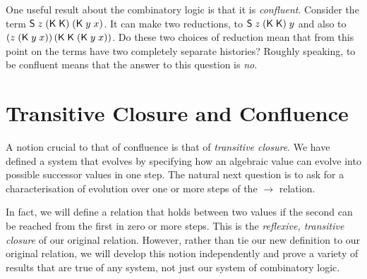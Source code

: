 \documentclass[12pt]{article}
\newcommand{\KC}{\con{K}}
\newcommand{\SC}{\con{S}}
\begin{document}
    One useful result about the combinatory logic is that it is
    \emph{confluent}.  Consider the term $\SC\;z\;(\KC\;\KC)\;(\KC\;
    y\; x)$.  It can make two reductions, to $\SC\;z\;(\KC\;\KC)\;y$
    and also to $(z\;(\KC\;y\;x))\,(\KC\;\KC\;(\KC\;y\;x))$.  Do these
    two choices of reduction mean that from this point on the terms
    have two completely separate histories?  Roughly speaking, to be
    confluent means that the answer to this question is \emph{no}.


\section{Transitive Closure and Confluence}
\label{sec:Transitive-Clos-Conf}

A notion crucial to that of confluence is that of \emph{transitive
  closure}.  We have defined a system that evolves by specifying how
an algebraic value can evolve into possible successor values in one
step.  The natural next question is to ask for a characterisation of
evolution over one or more steps of the $\rightarrow$ relation.

In fact, we will define a relation that holds between two values if
the second can be reached from the first in zero or more steps.  This
is the \emph{reflexive, transitive closure} of our original relation.
However, rather than tie our new definition to our original relation,
we will develop this notion independently and prove a variety of
results that are true of any system, not just our system of
combinatory logic.
\end{document}
